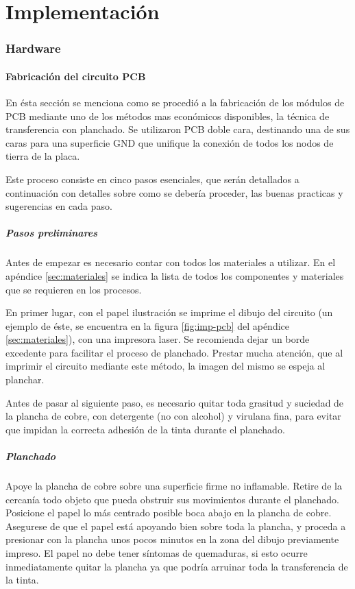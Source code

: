 \part{Implementación}\label{part:implementacion}

\section{Hardware}

\subsection{Fabricación del circuito PCB} \label{sec:fab-PCB}
En ésta sección se menciona como se procedió a la fabricación de los módulos de PCB mediante uno de los métodos mas económicos disponibles, la técnica de transferencia con planchado. Se utilizaron PCB doble cara, destinando una de sus caras para una superficie GND que unifique la conexión de todos los nodos de tierra de la placa.

Este proceso consiste en cinco pasos esenciales, que serán detallados a continuación con detalles sobre como se debería proceder, las buenas practicas y sugerencias en cada paso.

\subsubsection{Pasos preliminares}
Antes de empezar es necesario contar con todos los materiales a utilizar. En el apéndice \ref{sec:materiales} se indica la lista de todos los componentes y materiales que se requieren en los procesos.

En primer lugar, con el papel ilustración se imprime el dibujo del circuito (un ejemplo de éste, se encuentra en la figura \ref{fig:imp-pcb} del apéndice \ref{sec:materiales}), con una impresora laser. Se recomienda dejar un borde excedente para facilitar el proceso de planchado. Prestar mucha atención, que al imprimir el circuito mediante este método, la imagen del mismo se espeja al planchar.

Antes de pasar al siguiente paso, es necesario quitar toda grasitud y suciedad de la plancha de cobre, con detergente (no con alcohol) y virulana fina, para evitar que impidan la correcta adhesión de la tinta durante el planchado.

\subsubsection{Planchado}
Apoye la plancha de cobre sobre una superficie firme no inflamable. Retire de la cercanía todo objeto que pueda obstruir sus movimientos durante el planchado. Posicione el papel lo más centrado posible boca abajo en la plancha de cobre. Asegurese de que el papel está apoyando bien sobre toda la plancha, y proceda a presionar con la plancha unos pocos minutos en la zona del dibujo previamente impreso. El papel no debe tener síntomas de quemaduras, si esto ocurre inmediatamente quitar la plancha ya que podría arruinar toda la transferencia de la tinta.

